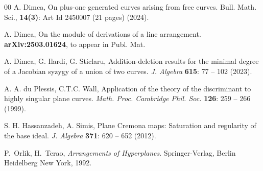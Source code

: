 \documentclass[12pt]{amsart}
\theoremstyle{plain}
\theoremstyle{definition}
\numberwithin{equation}{section}
\begin{document}
\begin{thebibliography}{00}
A. Dimca, On plus-one generated curves arising from free curves. {Bull. Math. Sci.},  \textbf{14(3)}: Art Id 2450007 (21 pages) (2024).

 A. Dimca,  On the module of derivations of a line arrangement. \textbf{arXiv:2503.01624}, to appear in Publ. Mat.

 A. Dimca, G. Ilardi, G. Sticlaru,  Addition-deletion results for the minimal degree of a Jacobian syzygy of a union of two curves.  \textit{J. Algebra}  \textbf{615}: 77 -- 102 (2023).

 A. A. du Plessis,  C.T.C. Wall, Application of the theory of the discriminant to highly singular plane curves. \textit{Math. Proc. Cambridge Phil. Soc.}  \textbf{126}: 259 -- 266 (1999). 

 S. H. Hassanzadeh, A. Simis, Plane Cremona maps: Saturation and regularity of the base ideal. \textit{J. Algebra} \textbf{371}: 620 -- 652 (2012).

P.\ Orlik, H.\ Terao, {\em Arrangements of Hyperplanes}. Springer-Verlag, Berlin Heidelberg New York, 1992.

\end{thebibliography} 
\end{document}
